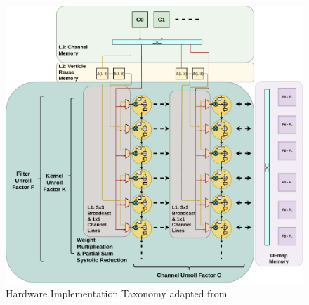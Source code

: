 \begin{figure}[ht]
    \centering
    \includegraphics[scale=0.58]{fig/hero-t-verticle.pdf}
    \caption{Hardware Implementation Taxonomy adapted from \cite{maestro}}
    \label{fig:hero:vertical}
\end{figure}


